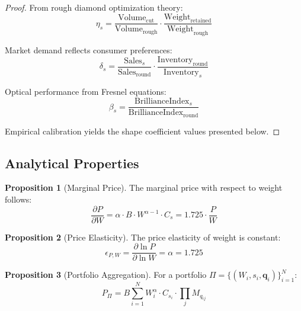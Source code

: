 \documentclass[12pt,a4paper]{article}
\theoremstyle{definition}
\newtheorem{proposition}{Proposition}
\theoremstyle{remark}
\begin{document}
\begin{proof}
From rough diamond optimization theory:
\begin{equation}
\eta_s = \frac{\text{Volume}_{\text{cut}}}{\text{Volume}_{\text{rough}}} \cdot \frac{\text{Weight}_{\text{retained}}}{\text{Weight}_{\text{rough}}}
\end{equation}

Market demand reflects consumer preferences:
\begin{equation}
\delta_s = \frac{\text{Sales}_s}{\text{Sales}_{\text{round}}} \cdot \frac{\text{Inventory}_{\text{round}}}{\text{Inventory}_s}
\end{equation}

Optical performance from Fresnel equations:
\begin{equation}
\beta_s = \frac{\text{BrillianceIndex}_s}{\text{BrillianceIndex}_{\text{round}}}
\end{equation}

Empirical calibration yields the shape coefficient values presented below.

\end{proof}

\subsection{Analytical Properties}

\begin{proposition}[Marginal Price]
The marginal price with respect to weight follows:
\begin{equation}
\frac{\partial P}{\partial W} = \alpha \cdot B \cdot W^{\alpha-1} \cdot C_s = 1.725 \cdot \frac{P}{W}
\end{equation}
\end{proposition}

\begin{proposition}[Price Elasticity]
The price elasticity of weight is constant:
\begin{equation}
\epsilon_{P,W} = \frac{\partial \ln P}{\partial \ln W} = \alpha = 1.725
\end{equation}
\end{proposition}

\begin{proposition}[Portfolio Aggregation]
For a portfolio $\Pi = \{(W_i, s_i, \mathbf{q}_i)\}_{i=1}^N$:
\begin{equation}
P_{\Pi} = B \sum_{i=1}^N W_i^{\alpha} \cdot C_{s_i} \cdot \prod_{j} M_{q_{ij}}
\end{equation}
\end{proposition}
\end{document}

